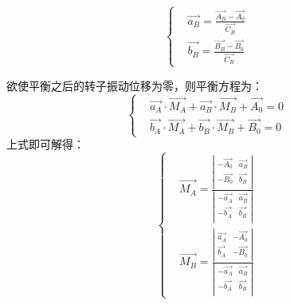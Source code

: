 \documentclass[
  lang=cn,
  degree=master,
  openany,oneside
]{nuaathesis}
\begin{document}
\begin{equation}
\left\{
\begin{aligned}
&	{\overrightarrow{a_B}} = \frac{{\overrightarrow{A_B}}-{\overrightarrow{A_0}}}{{\overrightarrow{C_B}}} \\
&		{\overrightarrow{b_B}} = \frac{{\overrightarrow{B_B}}-{\overrightarrow{B_0}}}{{\overrightarrow{C_B}}}
\end{aligned}
\right.
\end{equation}

欲使平衡之后的转子振动位移为零，则平衡方程为：
\begin{equation}
\left\{
\begin{aligned}
&	{\overrightarrow{a_A}}\cdot{\overrightarrow{M_A}} + {\overrightarrow{a_B}}\cdot{\overrightarrow{M_B}} + {\overrightarrow{A_0}} = 0 \\
&	{\overrightarrow{b_A}}\cdot{\overrightarrow{M_A}} + {\overrightarrow{b_B}}\cdot{\overrightarrow{M_B}} + {\overrightarrow{B_0}} = 0
\end{aligned}
\right.
\end{equation}
上式即可解得：
\begin{equation}
\label{eq:4-coff_m}
\left\{
\begin{aligned}
&{\overrightarrow{M_A}} = \frac{\left|\begin{array}{ccc} 
   -{\overrightarrow{A_0}} &  {\overrightarrow{a_B}}  \\ 
   -{\overrightarrow{B_0}} &  {\overrightarrow{b_B}} \\ 
\end{array}\right| }{\left|\begin{array}{ccc} 
   -{\overrightarrow{a_A}} &  {\overrightarrow{a_B}}  \\ 
   -{\overrightarrow{b_A}} &  {\overrightarrow{b_B}} \\ 
\end{array}\right| } \\
&{\overrightarrow{M_B}} = \frac{\left|\begin{array}{ccc} 
   {\overrightarrow{a_A}} &  -{\overrightarrow{A_0}}  \\ 
   {\overrightarrow{b_A}} &  -{\overrightarrow{B_0}} \\ 
\end{array}\right| }{\left|\begin{array}{ccc} 
   -{\overrightarrow{a_A}} &  {\overrightarrow{a_B}}  \\ 
   -{\overrightarrow{b_A}} &  {\overrightarrow{b_B}} \\ 
\end{array}\right| }	
\end{aligned}
\right.
\end{equation}
\end{document}
